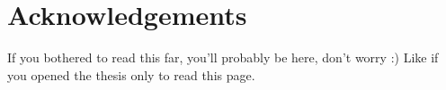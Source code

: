 \documentclass[oneside,11pt]{Classes/PhDthesisPSnPDF}
\begin{document}
\newpage
{}
\begin{tiny}
  \listoffigures
\end{tiny}


\newpage
{}



\newpage
\chapter*{Acknowledgements}

If you bothered to read this far, you'll probably be here, don't worry :)
\newline\newline\newline
{} Like if you opened the thesis only to read this page.
\end{document}
